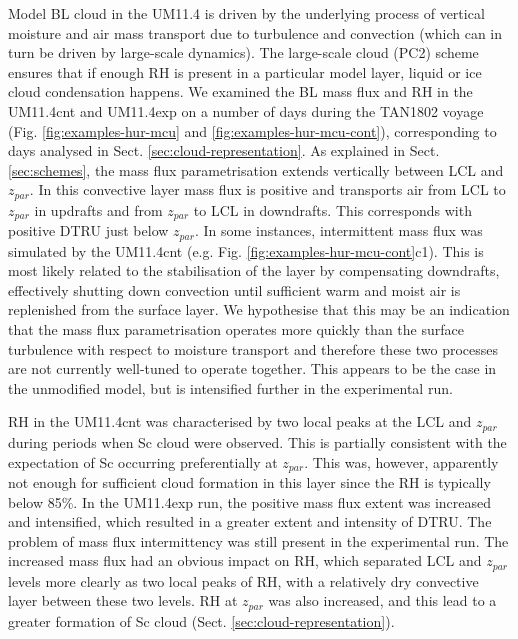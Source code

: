 Model BL cloud in the UM11.4 is driven by the underlying process
of vertical moisture and air mass transport due to turbulence and convection
(which can in turn be driven by large-scale dynamics). The large-scale cloud
(PC2) scheme ensures that if enough RH is present in a particular model
layer, liquid or ice cloud condensation happens. We examined the BL mass
flux and RH in the UM11.4cnt and UM11.4exp on a number of days during the TAN1802
voyage (Fig. \ref{fig:examples-hur-mcu} and \ref{fig:examples-hur-mcu-cont}),
corresponding to days analysed in Sect. \ref{sec:cloud-representation}.
As explained in Sect. \ref{sec:schemes}, the mass flux parametrisation
extends vertically between LCL and $z_{par}$. In this convective layer mass
flux is positive and transports air from LCL to $z_{par}$ in updrafts
and from $z_{par}$ to LCL in downdrafts. 
This corresponds with positive
DTRU just below $z_{par}$. In some instances, intermittent mass flux was
simulated by the UM11.4cnt (e.g. Fig. \ref{fig:examples-hur-mcu-cont}c1). This
is most likely related to the stabilisation of the layer by compensating
downdrafts, effectively shutting down convection until sufficient warm
and moist air is replenished from the surface layer. We hypothesise that this
may be an indication that the mass flux parametrisation operates more quickly 
than the surface turbulence with respect to moisture transport and therefore these two processes are not currently well-tuned to operate together. This appears to be the case in the unmodified
model, but is intensified further in the experimental run.

RH in the UM11.4cnt was characterised by two local peaks at the LCL and $z_{par}$
during periods when Sc cloud were observed. This is partially consistent
with the expectation of Sc occurring preferentially at $z_{par}$. This was, however, apparently not enough for sufficient cloud formation in this layer since the RH is typically below 85\%.
In the UM11.4exp run, the positive mass flux extent was increased and intensified,
which resulted in a greater extent and intensity of DTRU. The problem of
mass flux intermittency was still present in the experimental run. The increased
mass flux had an obvious impact on RH, which separated LCL and $z_{par}$
levels more clearly as two local peaks of RH, with a relatively dry
convective layer between these two levels. RH at $z_{par}$ was also increased,
and this lead to a greater formation of Sc cloud (Sect.
\ref{sec:cloud-representation}). 


